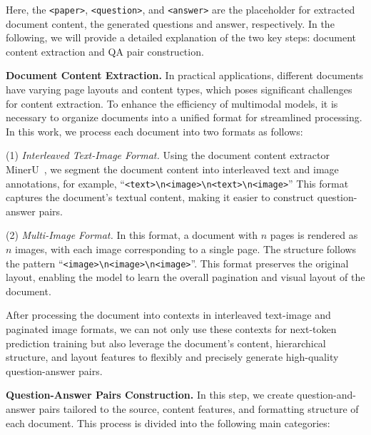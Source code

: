 \documentclass[10pt,twocolumn,letterpaper]{article}
\begin{document}
\begin{CJK}{UTF8}{gbsn}
\begin{center}
\small
{}
\end{center}

\noindent Here, the \texttt{<paper>}, \texttt{<question>}, and \texttt{<answer>} are the placeholder for extracted document content, the generated questions and answer, respectively. In the following, we will provide a detailed explanation of the two key steps: document content extraction and QA pair construction.

\newcommand\ysl[1]{\textcolor{blue}{#1}}

\noindent\textbf{Document Content Extraction.}
In practical applications, different documents have varying page layouts and content types, which poses significant challenges for content extraction. To enhance the efficiency of multimodal models, it is necessary to organize documents into a unified format for streamlined processing.
In this work, we process each document into two formats as follows:

(1) \emph{Interleaved Text-Image Format.} Using the document content extractor MinerU~\cite{wang2024mineru}, we segment the document content into interleaved text and image annotations, for example, 
``\texttt{<text>\textbackslash n<image>\textbackslash n<text>\textbackslash n<image>}''
This format captures the document’s textual content, making it easier to construct question-answer pairs. 


(2) \emph{Multi-Image Format.} In this format, a document with $n$ pages is rendered as $n$ images, with each image corresponding to a single page. The structure follows the pattern ``\texttt{<image>\textbackslash n<image>\textbackslash n<image>}''. This format preserves the original layout, enabling the model to learn the overall pagination and visual layout of the document.

After processing the document into contexts in interleaved text-image and paginated image formats, we can not only use these contexts for next-token prediction training but also leverage the document's content, hierarchical structure, and layout features to flexibly and precisely generate high-quality question-answer pairs.


\noindent\textbf{Question-Answer Pairs Construction.}
In this step, we create question-and-answer pairs tailored to the source, content features, and formatting structure of each document. This process is divided into the following main categories:


\end{CJK}
\end{document}
